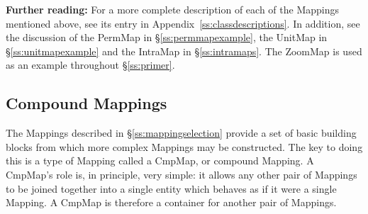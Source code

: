 \documentclass[twoside,11pt]{article}
\newcommand{\appref}[1]{Appendix~\ref{#1}}
\newcommand{\secref}[1]{\S\ref{#1}}
\newcommand{\appref}[1]{\ref{#1}}
\newcommand{\secref}[1]{\ref{#1}}
\begin{document}
{\bf{Further reading:}} For a more complete description of each of the
Mappings mentioned above, see its entry in
\appref{ss:classdescriptions}. In addition, see the discussion of the
PermMap in \secref{ss:permmapexample}, the UnitMap in
\secref{ss:unitmapexample} and the IntraMap in
\secref{ss:intramaps}. The ZoomMap is used as an example throughout
\secref{ss:primer}.

\subsection{\label{ss:cmpmapoverview}Compound Mappings}

The Mappings described in \secref{ss:mappingselection} provide a set
of basic building blocks from which more complex Mappings may be
constructed. The key to doing this is a type of Mapping called a
CmpMap, or compound Mapping.  A CmpMap's role is, in principle, very
simple: it allows any other pair of Mappings to be joined together
into a single entity which behaves as if it were a single Mapping. A
CmpMap is therefore a container for another pair of Mappings.
\end{document}
